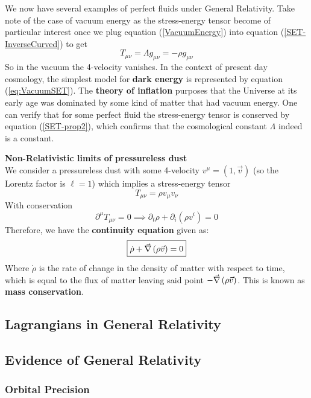 \documentclass{article}
\begin{document}
 		We now have several examples of perfect fluids under General Relativity. Take note of the case of vacuum energy as the stress-energy tensor become of particular interest once we plug equation (\ref{VacuumEnergy}) into equation (\ref{SET-InverseCurved}) to get
 		\begin{equation}
 			\label{eq:VacuumSET}
 			T_{\mu\nu} = \Lambda g_{\mu\nu} = -\rho g_{\mu\nu}
 		\end{equation}
 		So in the vacuum the 4-velocity vanishes. In the context of present day cosmology, the simplest model for \textbf{dark energy} is represented by equation (\ref{eq:VacuumSET}). The \textbf{theory of inflation} purposes that the Universe at its early age was dominated by some kind of matter that had vacuum energy. One can verify that for some perfect fluid the stress-energy tensor is conserved by equation (\ref{SET-prop2}), which confirms that the cosmological constant $\Lambda$ indeed is a constant.
 		
 		\begin{exmp}
 			\textbf{Non-Relativistic limits of pressureless dust}\\
 			We consider a pressureless dust with some 4-velocity $v^\mu = (1, \vec{v})$ (so the Lorentz factor is $\ell=1$) which implies a stress-energy tensor
 			$$ T_{\mu\nu} = \rho v_\mu v_\nu$$
 			With conservation
 			$$ \partial^\mu T_{\mu\nu} = 0 \implies \partial_t \rho + \partial_i \left( \rho v^i \right) = 0  $$
 			Therefore, we have the \textbf{continuity equation} given as:
 			\begin{equation}
 				\label{eq:Continuity}
 				\boxed{\dot{\rho} + \vec{\nabla} \left(\rho \vec{v}\right) = 0 }
 			\end{equation}
 			Where $\dot\rho$ is the rate of change in the density of matter with respect to time, which is equal to the flux of matter leaving said point $-\vec{\nabla}\left(\rho \vec{v}\right)$. This is known as \textbf{mass conservation}.
 		\end{exmp}
 		
 	\subsection{Lagrangians in General Relativity}
 		
 	\subsection{Evidence of General Relativity}
 	\subsubsection{Orbital Precision}
\end{document}
